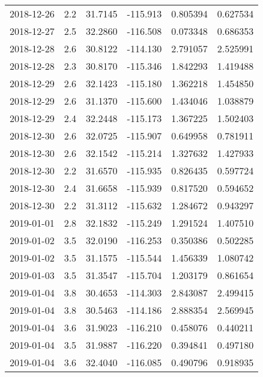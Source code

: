 \begin{tabular}{lrrrrr}
2018-12-26 &       2.2 &  31.7145 &  -115.913 &         0.805394 &         0.627534 \\
2018-12-27 &       2.5 &  32.2860 &  -116.508 &         0.073348 &         0.686353 \\
2018-12-28 &       2.6 &  30.8122 &  -114.130 &         2.791057 &         2.525991 \\
2018-12-28 &       2.3 &  30.8170 &  -115.346 &         1.842293 &         1.419488 \\
2018-12-29 &       2.6 &  32.1423 &  -115.180 &         1.362218 &         1.454850 \\
2018-12-29 &       2.6 &  31.1370 &  -115.600 &         1.434046 &         1.038879 \\
2018-12-29 &       2.4 &  32.2448 &  -115.173 &         1.367225 &         1.502403 \\
2018-12-30 &       2.6 &  32.0725 &  -115.907 &         0.649958 &         0.781911 \\
2018-12-30 &       2.6 &  32.1542 &  -115.214 &         1.327632 &         1.427933 \\
2018-12-30 &       2.2 &  31.6570 &  -115.935 &         0.826435 &         0.597724 \\
2018-12-30 &       2.4 &  31.6658 &  -115.939 &         0.817520 &         0.594652 \\
2018-12-30 &       2.2 &  31.3112 &  -115.632 &         1.284672 &         0.943297 \\
2019-01-01 &       2.8 &  32.1832 &  -115.249 &         1.291524 &         1.407510 \\
2019-01-02 &       3.5 &  32.0190 &  -116.253 &         0.350386 &         0.502285 \\
2019-01-02 &       3.5 &  31.1575 &  -115.544 &         1.456339 &         1.080742 \\
2019-01-03 &       3.5 &  31.3547 &  -115.704 &         1.203179 &         0.861654 \\
2019-01-04 &       3.8 &  30.4653 &  -114.303 &         2.843087 &         2.499415 \\
2019-01-04 &       3.8 &  30.5463 &  -114.186 &         2.888354 &         2.569945 \\
2019-01-04 &       3.6 &  31.9023 &  -116.210 &         0.458076 &         0.440211 \\
2019-01-04 &       3.5 &  31.9887 &  -116.220 &         0.394841 &         0.497180 \\
2019-01-04 &       3.6 &  32.4040 &  -116.085 &         0.490796 &         0.918935 \\

\end{tabular}
